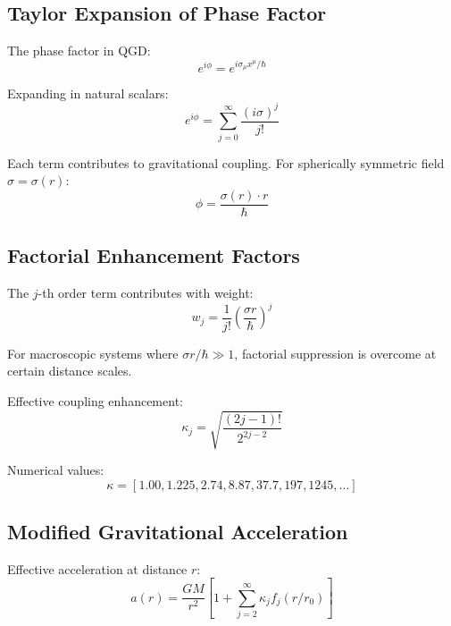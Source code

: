 \documentclass[11pt,a4paper]{article}
\theoremstyle{definition}
\theoremstyle{remark}
\begin{document}
	\subsection{Taylor Expansion of Phase Factor}
	
	The phase factor in QGD:
	\begin{equation}
		e^{i\phi} = e^{i\sigma_\mu x^\mu/\hbar}
	\end{equation}
	
	Expanding in natural scalars:
	\begin{equation}
		e^{i\phi} = \sum_{j=0}^\infty \frac{(i\sigma)^j}{j!}
	\end{equation}
	
	Each term contributes to gravitational coupling. For spherically symmetric field $\sigma = \sigma(r)$:
	\begin{equation}
		\phi = \frac{\sigma(r) \cdot r}{\hbar}
	\end{equation}
	
	\subsection{Factorial Enhancement Factors}
	
	The $j$-th order term contributes with weight:
	\begin{equation}
		w_j = \frac{1}{j!}\left(\frac{\sigma r}{\hbar}\right)^j
	\end{equation}
	
	For macroscopic systems where $\sigma r/\hbar \gg 1$, factorial suppression is overcome at certain distance scales.
	
	Effective coupling enhancement:
	\begin{equation}\label{eq:kappa_factors}
		\boxed{\kappa_j = \sqrt{\frac{(2j-1)!}{2^{2j-2}}}}
	\end{equation}
	
	Numerical values:
	\begin{equation}
		\kappa = [1.00, 1.225, 2.74, 8.87, 37.7, 197, 1245, \ldots]
	\end{equation}
	
	\subsection{Modified Gravitational Acceleration}
	
	Effective acceleration at distance $r$:
	\begin{equation}
		a(r) = \frac{GM}{r^2}\left[1 + \sum_{j=2}^\infty \kappa_j f_j(r/r_0)\right]
	\end{equation}
	
\end{document}
